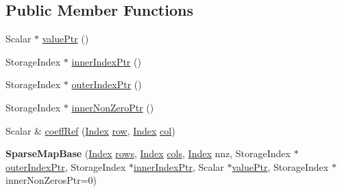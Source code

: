 \subsection*{Public Member Functions}
\begin{DoxyCompactItemize}
\item 
Scalar $\ast$ \mbox{\hyperlink{class_eigen_1_1_sparse_map_base_3_01_derived_00_01_write_accessors_01_4_af91648a18729ae8ff29cb1d8751c5655}{value\+Ptr}} ()
\item 
Storage\+Index $\ast$ \mbox{\hyperlink{class_eigen_1_1_sparse_map_base_3_01_derived_00_01_write_accessors_01_4_af5cd1f13dde8578eb9891a4ac4a11977}{inner\+Index\+Ptr}} ()
\item 
Storage\+Index $\ast$ \mbox{\hyperlink{class_eigen_1_1_sparse_map_base_3_01_derived_00_01_write_accessors_01_4_a3b74af754254837fc591cd9936688b95}{outer\+Index\+Ptr}} ()
\item 
Storage\+Index $\ast$ \mbox{\hyperlink{class_eigen_1_1_sparse_map_base_3_01_derived_00_01_write_accessors_01_4_af877ea4e285a4497f80987fea66f7459}{inner\+Non\+Zero\+Ptr}} ()
\item 
Scalar \& \mbox{\hyperlink{class_eigen_1_1_sparse_map_base_3_01_derived_00_01_write_accessors_01_4_aa9c42d48b9dd6f947ce3c257fe4bf2ca}{coeff\+Ref}} (\mbox{\hyperlink{struct_eigen_1_1_eigen_base_a554f30542cc2316add4b1ea0a492ff02}{Index}} \mbox{\hyperlink{class_eigen_1_1_sparse_matrix_base_ac0a5563ed3f243f013fb9d2c17e230d0}{row}}, \mbox{\hyperlink{struct_eigen_1_1_eigen_base_a554f30542cc2316add4b1ea0a492ff02}{Index}} \mbox{\hyperlink{class_eigen_1_1_sparse_matrix_base_a8f4eaa3c3921ef3823ffc69ebcc356af}{col}})
\item 
\mbox{\label{class_eigen_1_1_sparse_map_base_3_01_derived_00_01_write_accessors_01_4_a4d5c87bc7ef16390eb48763853859c83}} 
{\bfseries Sparse\+Map\+Base} (\mbox{\hyperlink{struct_eigen_1_1_eigen_base_a554f30542cc2316add4b1ea0a492ff02}{Index}} \mbox{\hyperlink{class_eigen_1_1_sparse_map_base_3_01_derived_00_01_read_only_accessors_01_4_a3cdd6cab0abd7ac01925a695fc315d34}{rows}}, \mbox{\hyperlink{struct_eigen_1_1_eigen_base_a554f30542cc2316add4b1ea0a492ff02}{Index}} \mbox{\hyperlink{class_eigen_1_1_sparse_map_base_3_01_derived_00_01_read_only_accessors_01_4_a0fc44f3781a869a3a410edd6691fd899}{cols}}, \mbox{\hyperlink{struct_eigen_1_1_eigen_base_a554f30542cc2316add4b1ea0a492ff02}{Index}} nnz, Storage\+Index $\ast$\mbox{\hyperlink{class_eigen_1_1_sparse_map_base_3_01_derived_00_01_write_accessors_01_4_a3b74af754254837fc591cd9936688b95}{outer\+Index\+Ptr}}, Storage\+Index $\ast$\mbox{\hyperlink{class_eigen_1_1_sparse_map_base_3_01_derived_00_01_write_accessors_01_4_af5cd1f13dde8578eb9891a4ac4a11977}{inner\+Index\+Ptr}}, Scalar $\ast$\mbox{\hyperlink{class_eigen_1_1_sparse_map_base_3_01_derived_00_01_write_accessors_01_4_af91648a18729ae8ff29cb1d8751c5655}{value\+Ptr}}, Storage\+Index $\ast$inner\+Non\+Zeros\+Ptr=0)

\end{DoxyCompactItemize}
